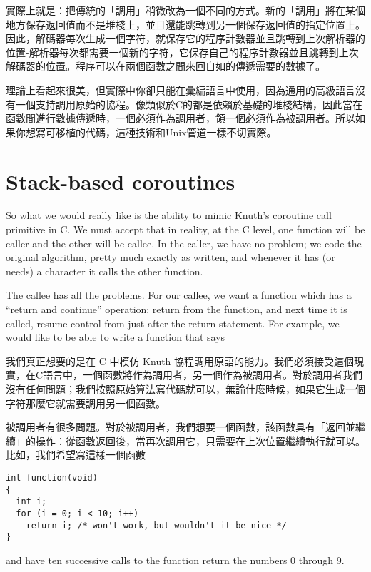 \documentclass[12pt]{article}
\begin{document}
\begin{CJK}{UTF8}{bsmi}
 實際上就是：把傳統的「調用」稍微改為一個不同的方式。新的「調用」將在某個地方保存返回值而不是堆棧上，並且還能跳轉到另一個保存返回值的指定位置上。因此，解碼器每次生成一個字符，就保存它的程序計數器並且跳轉到上次解析器的位置-解析器每次都需要一個新的字符，它保存自己的程序計數器並且跳轉到上次解碼器的位置。程序可以在兩個函數之間來回自如的傳遞需要的數據了。

理論上看起來很美，但實際中你卻只能在彙編語言中使用，因為通用的高級語言沒有一個支持調用原始的協程。像類似於C的都是依賴於基礎的堆棧結構，因此當在函數間進行數據傳遞時，一個必須作為調用者，領一個必須作為被調用者。所以如果你想寫可移植的代碼，這種技術和Unix管道一樣不切實際。

\section{Stack-based coroutines}

So what we would really like is the ability to mimic Knuth's coroutine call primitive in C. We must accept that in reality, at the C level, one function will be caller and the other will be callee. In the caller, we have no problem; we code the original algorithm, pretty much exactly as written, and whenever it has (or needs) a character it calls the other function.

The callee has all the problems. For our callee, we want a function which has a ``return and continue'' operation: return from the function, and next time it is called, resume control from just after the return statement. For example, we would like to be able to write a function that says

我們真正想要的是在 C 中模仿 Knuth 協程調用原語的能力。我們必須接受這個現實，在C語言中，一個函數將作為調用者，另一個作為被調用者。對於調用者我們沒有任何問題；我們按照原始算法寫代碼就可以，無論什麼時候，如果它生成一個字符那麼它就需要調用另一個函數。

 被調用者有很多問題。對於被調用者，我們想要一個函數，該函數具有「返回並繼續」的操作：從函數返回後，當再次調用它，只需要在上次位置繼續執行就可以。比如，我們希望寫這樣一個函數 

\begin{lstlisting}[basicstyle=\footnotesize, breaklines=true]
int function(void) 
{
  int i;
  for (i = 0; i < 10; i++)
    return i; /* won't work, but wouldn't it be nice */
}
\end{lstlisting}

and have ten successive calls to the function return the numbers 0 through 9.


\end{CJK}
\end{document}

